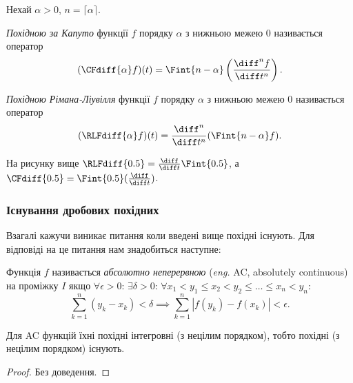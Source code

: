Нехай $\alpha > 0$, $n = \lceil \alpha \rceil$.

\begin{definition}
    \textit{Похідною за Капуто} функції $f$ порядку $\alpha$ з нижньою межею $0$ називається оператор
    \begin{equation}
        (\CFdiff{\alpha} f)(t) = \Fint{n - \alpha} \left( \frac{\diff^n f}{\diff t^n} \right).
    \end{equation}
\end{definition}

\begin{definition}
    \textit{Похідною Рімана-Ліувілля} функції $f$ порядку $\alpha$ з нижньою межею $0$ називається оператор
    \begin{equation}
        (\RLFdiff{\alpha} f)(t) = \frac{\diff^n}{\diff t^n} ( \Fint{n - \alpha} f ).
    \end{equation}
\end{definition}

\begin{example}
    На рисунку вище $\RLFdiff{0.5} = \frac{\diff}{\diff t} \Fint{0.5}$, а $\CFdiff{0.5} = \Fint{0.5} ( \frac{\diff}{\diff t} )$.
\end{example}

\subsubsection{Існування дробових похідних}

Взагалі кажучи виникає питання коли введені вище похідні існують. Для відповіді на це питання нам знадобиться наступне:
\begin{definition}
    Функція $f$ називається \textit{абсолютно неперервною} (\textit{eng.} AC, absolutely continuous) на проміжку $I$ якщо $\forall \epsilon > 0$: $\exists \delta > 0$: $\forall x_1 < y_1 \le x_2 < y_2 \le \ldots \le x_n < y_n$:
    \begin{equation}
        \sum_{k = 1}^n (y_k - x_k) < \delta \implies \sum_{k = 1}^n |f(y_k) - f(x_k)| < \epsilon.
    \end{equation}
\end{definition}

\begin{proposition}
    Для AC функцій їхні похідні інтегровні (з нецілим порядком), тобто похідні (з нецілим порядком) існують.
\end{proposition}
\begin{proof}
    Без доведення.
\end{proof}

